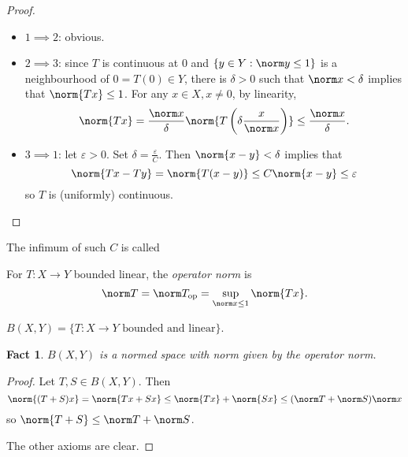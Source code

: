 \documentclass[a4paper]{article}
\newtheorem*{fact}{Fact}
\begin{document}
\begin{proof}\leavevmode
  \begin{itemize}
  \item \(1 \implies 2\): obvious.
  \item \(2 \implies 3\): since \(T\) is continuous at \(0\) and \(\{y \in Y: \norm y \leq 1\}\) is a neighbourhood of \(0 = T(0) \in Y\), there is \(\delta > 0\) such that \(\norm x < \delta\) implies that \(\norm{T x} \leq 1\). For any \(x \in X, x \neq 0\), by linearity,
    \[
      \norm{T x} = \frac{\norm x}{\delta} \norm{T \left(\delta \frac{x}{\norm x} \right)} \leq \frac{\norm x}{\delta}.
    \]
  \item \(3 \implies 1\): let \(\varepsilon > 0\). Set \(\delta = \frac{\varepsilon}{C}\). Then \(\norm{x - y} < \delta\) implies that
    \[
      \norm{Tx - Ty} = \norm{T(x - y)} \leq C \norm{x - y} \leq \varepsilon
    \]
    so \(T\) is (uniformly) continuous.
  \end{itemize}
\end{proof}

The infimum of such \(C\) is called

\begin{definition}
  For \(T: X \to Y\) bounded linear, the \emph{operator norm} is
  \[
    \norm T = \norm T_{\text{op}} = \sup_{\norm x \leq 1} \norm{Tx}.
  \]
\end{definition}

\begin{notation}
  \(B(X, Y) = \{T: X \to Y \text{ bounded and linear}\}\).
\end{notation}

\begin{fact}
  \(B(X, Y)\) is a normed space with norm given by the operator norm.
\end{fact}

\begin{proof}
  Let \(T, S \in B(X, Y)\). Then
  \[
    \norm{(T + S)x} = \norm{Tx + Sx}
    \leq \norm{Tx} + \norm{Sx}
    \leq (\norm T + \norm S) \norm x
  \]
  so \(\norm{T + S} \leq \norm T + \norm S\).

  The other axioms are clear.
\end{proof}
\end{document}

